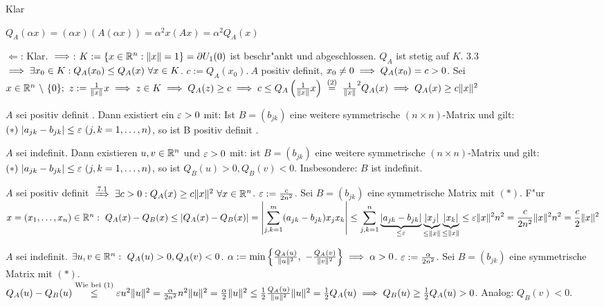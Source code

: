 \documentclass[a4paper,twoside,DIV15,BCOR12mm]{scrbook}
\begin{document}
\begin{beweise}
\item Klar
\item $Q_A(\alpha x)=(\alpha x)(A(\alpha x))=\alpha^2x(Ax)=\alpha^2Q_A(x)$
\item \glqq$\Leftarrow$\grqq: Klar. \glqq$\implies$\grqq: $K:=\{x\in\mathbb{R}^n: \|x\|=1\}=\partial U_1(0)$ ist beschr"ankt und abgeschlossen. $Q_A$ ist stetig auf $K$. 3.3 $\implies\exists x_0\in K: Q_A(x_0)\le Q_A(x)\ \forall x\in K$. $c:=Q_A(x_0).\ A$ positiv definit, $x_0\ne 0\implies Q_A(x_0)=c>0$. Sei $x\in\MdR^n\ \backslash\ \{0\};\ z:=\frac{1}{\|x\|}x\folgt z\in K\folgt Q_A(z)\ge c\folgt c \le Q_A\left(\frac{1}{\|x\|}x\right)\gleichnach{(2)}\frac{1}{\|x\|}^2Q_A(x)\folgt Q_A(x)\ge c\|x\|^2$
\end{beweise}

\begin{satz}
\begin{liste}
\item $A$ sei positiv definit . Dann existiert ein $\varepsilon>0$ mit: Ist $B=(b_{jk})$ eine weitere symmetrische $(n\times n)$-Matrix und gilt: $(*)\ |a_{jk}-b_{jk}|\le\ep\ (j,k=1,\ldots, n)$, so ist B positiv definit .
\item $A$ sei indefinit. Dann existieren $u,v\in\mathbb{R}^n$ und $\varepsilon>0$ mit: ist $B=(b_{jk})$ eine weitere symmetrische $(n\times n)$-Matrix und gilt: $(*)\ |a_{jk}-b_{jk}|\le\ep\ (j,k=1,\ldots,n)$, so ist $Q_B(u)>0, Q_B(v)<0$. Insbesondere: $B$ ist indefinit.
\end{liste}
\end{satz}

\begin{beweise}
\item $A$ sei positiv definit $\folgtnach{7.1}\exists c>0: Q_A(x)\ge c\|x\|^2\ \forall x\in\MdR^n$. $\varepsilon:=\frac{c}{2n^2}$. Sei $B=(b_{jk})$ eine symmetrische Matrix mit $(*)$. F"ur $x=(x_1,\ldots,x_n)\in\MdR^n:\ Q_A(x)-Q_B(x)\le|Q_A(x)-Q_B(x)|=\left|\ds\sum_{j,k=1}^m(a_{jk}-b_{jk})x_jx_k\right|\le\ds\sum_{j,k=1}^n\underbrace{|a_{jk}-b_{jk}|}_{\le\ep}\underbrace{|x_j|}_{\le\|x\|}\underbrace{|x_k|}_{\le\|x\|}\le\ep\|x\|^2n^2=\frac{c}{2n^2}\|x\|^2n^2=\frac{c}{2}\|x\|^2$
\item $A$ sei indefinit. $\exists u,v\in\MdR^n:\ Q_A(u)>0, Q_A(v)<0$. $\alpha:=\min\left\{\frac{Q_A(u)}{\|u\|^2},\ -\frac{Q_A(v)}{\|v\|^2}\right\}\folgt\alpha>0$. $\varepsilon:=\frac{\alpha}{2n^2}$. Sei $B=(b_{jk})$ eine symmetrische Matrix mit $(*)$.\\
$Q_A(u)-Q_B(u)\overset{\text{Wie bei (1)}}{\le}\varepsilon u^2\|u\|^2=\frac{\alpha}{2n^2}n^2\|u\|^2=\frac{\alpha}{2}\|u\|^2\le\frac{1}{2}\frac{Q_A(u)}{\|u\|^2}\|u\|^2=\frac{1}{2}Q_A(u) \implies Q_B(u)\ge\frac{1}{2}Q_A(u)>0$. Analog: $Q_B(v)<0$.
\end{beweise}
\end{document}
